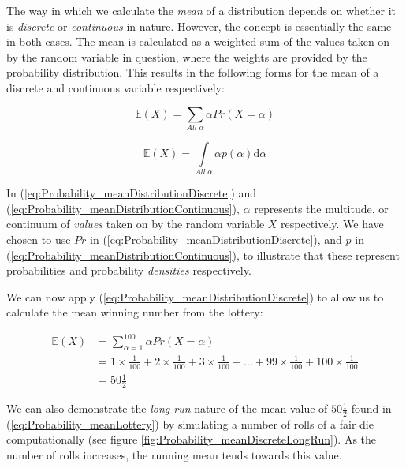 \documentclass[11pt,fullpage]{book}
\begin{document}
The way in which we calculate the \textit{mean} of a distribution depends on whether it is \textit{discrete} or \textit{continuous} in nature. However, the concept is essentially the same in both cases. The mean is calculated as a weighted sum of the values taken on by the random variable in question, where the weights are provided by the probability distribution. This results in the following forms for the mean of a discrete and continuous variable respectively:

\begin{equation}\label{eq:Probability_meanDistributionDiscrete}
\mathbb{E}(X) = \sum\limits_{All\; \alpha} \alpha Pr(X=\alpha)
\end{equation}

\begin{equation}\label{eq:Probability_meanDistributionContinuous}
\mathbb{E}(X) = \int\limits_{All\; \alpha} \alpha p(\alpha)\mathrm{d}\alpha
\end{equation}

In (\ref{eq:Probability_meanDistributionDiscrete}) and (\ref{eq:Probability_meanDistributionContinuous}), $\alpha$ represents the multitude, or continuum of \textit{values} taken on by the random variable $X$ respectively.  We have chosen to use $Pr$ in (\ref{eq:Probability_meanDistributionDiscrete}), and $p$ in (\ref{eq:Probability_meanDistributionContinuous}), to illustrate that these represent probabilities and probability \textit{densities} respectively.

We can now apply (\ref{eq:Probability_meanDistributionDiscrete}) to allow us to calculate the mean winning number from the lottery:

\begin{align}\label{eq:Probability_meanLottery}
\mathbb{E}(X) &= \sum\limits_{\alpha=1}^{100} \alpha Pr(X=\alpha)\\
&= 1\times\frac{1}{100} +  2\times\frac{1}{100} +  3\times\frac{1}{100} + ... +  99\times\frac{1}{100} +  100\times\frac{1}{100}\\
&= 50\tfrac{1}{2}
\end{align}

We can also demonstrate the \textit{long-run} nature of the mean value of $50\tfrac{1}{2}$ found in (\ref{eq:Probability_meanLottery}) by simulating a number of rolls of a fair die computationally (see figure \ref{fig:Probability_meanDiscreteLongRun}). As the number of rolls increases, the running mean tends towards this value.
\end{document}
